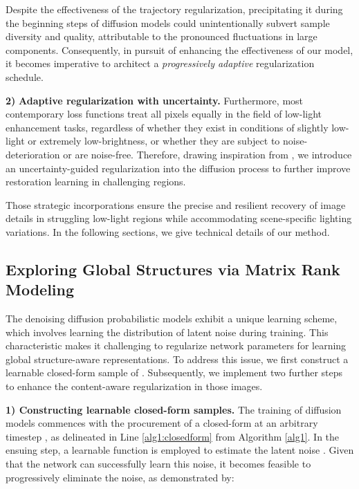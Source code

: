\documentclass{article}
\begin{document}
Despite the effectiveness of the trajectory regularization, precipitating it during the beginning steps of diffusion models could unintentionally subvert sample diversity and quality, attributable to the pronounced fluctuations in large components. Consequently, in pursuit of enhancing the effectiveness of our model, it becomes imperative to architect a \textit{progressively adaptive} regularization schedule.

\textbf{2)} \textbf{Adaptive regularization with uncertainty.} Furthermore, most contemporary loss functions treat all pixels equally in the field of low-light enhancement tasks, regardless of whether they exist in conditions of slightly low-light or extremely low-brightness, or whether they are subject to noise-deterioration or are noise-free. Therefore, drawing inspiration from \cite{ning2021uncertainty}, we introduce an uncertainty-guided regularization into the diffusion process to further improve restoration learning in challenging regions.

Those strategic incorporations ensure the precise and resilient recovery of image details in struggling low-light regions while accommodating scene-specific lighting variations. In the following sections, we give technical details of our method.






\subsection{Exploring Global Structures via Matrix Rank Modeling}
\label{sec:GStructure}
The denoising diffusion probabilistic models exhibit a unique learning scheme, which involves learning the distribution of latent noise during training. This characteristic makes it challenging to regularize network parameters  for learning global structure-aware representations. To address this issue, we first construct a learnable closed-form sample of . Subsequently, we implement two further steps to enhance the content-aware regularization in those images.

\textbf{1) Constructing learnable closed-form samples.}
The training of diffusion models commences with the procurement of a closed-form  at an arbitrary timestep , as delineated in Line \ref{alg1:closedform} from Algorithm \ref{alg1}. In the ensuing step, a learnable function  is employed to estimate the latent noise . Given that the network can successfully learn this noise, it becomes feasible to progressively eliminate the noise, as demonstrated by:
\end{document}
